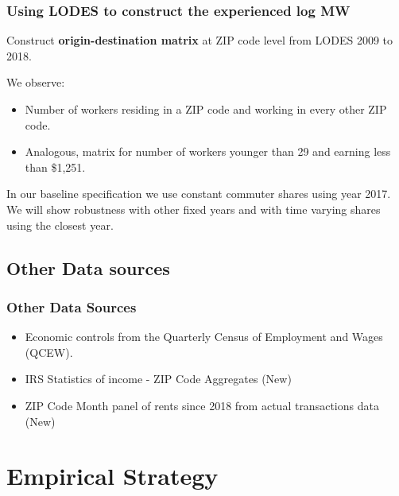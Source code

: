 \documentclass[aspectratio=169, t]{beamer}
\begin{document}
\begin{frame}
	\frametitle{Using LODES to construct the experienced log MW}
	
	\vspace{2mm}
	
	Construct \textbf{origin-destination matrix} at ZIP code level from LODES 2009 to 2018.
	
	\vspace{2mm}

	We observe:
	\begin{itemize} \small
		\item Number of workers residing in a ZIP code and working in every other 
		ZIP code.
		\item Analogous, matrix for number of workers younger than 29 and earning less than 
		\$1,251.
	\end{itemize}
	
	\vspace{2mm}
	
	In our baseline specification we use constant commuter shares using year 2017. We will show robustness with 
	other fixed years and with time varying shares using the closest year.
\end{frame}

\subsection{Other Data sources}

\begin{frame}
	\frametitle{Other Data Sources} 
	
	\begin{itemize}
		\item Economic controls from the Quarterly Census of Employment and Wages 
		{\small (QCEW)}.
		\vspace{2mm}  \item IRS Statistics of income - ZIP Code Aggregates (New)
		\vspace{2mm} \item ZIP Code Month panel of rents since 2018 from actual transactions data (New)
	\end{itemize}
\end{frame}

\section{Empirical Strategy}
\end{document}
